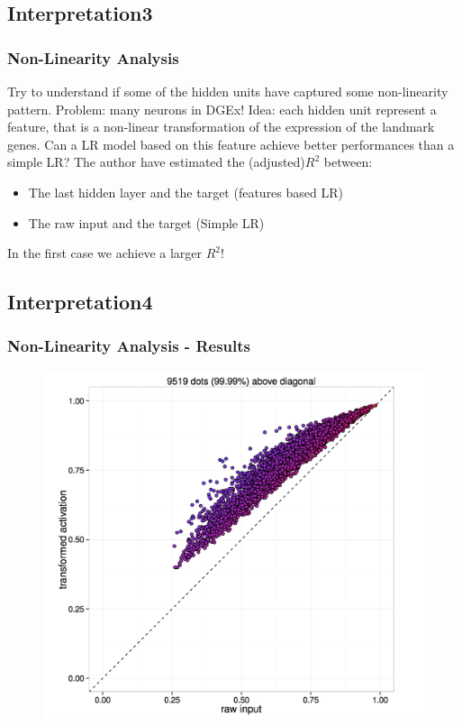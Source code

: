 \documentclass[professionalfont]{beamer}
\begin{document}
    \subsection{Interpretation3}
      \begin{frame}
        \frametitle{Non-Linearity Analysis}
          Try to understand if some of the hidden units have captured
          some non-linearity pattern.\newline
          Problem: many neurons in DGEx!\newline
          \newline
          Idea: each hidden unit represent a feature, that is a non-linear
          transformation of the expression of the landmark genes.\newline
          Can a LR model based on this feature achieve better performances than
          a simple LR?\newline
          The author have estimated the (adjusted)$R^2$ between:
          \begin{itemize}
            \item The last hidden layer and the target (features based LR)
            \item The raw input and the target (Simple LR)
          \end{itemize}
          In the first case we achieve a larger $R^2$!
      \end{frame}

    \subsection{Interpretation4}
      \begin{frame}
          \frametitle{Non-Linearity Analysis - Results}
          \begin{figure}
            \includegraphics[scale=0.35]{figures/r2.png}
          \end{figure}
      \end{frame}
\end{document}
